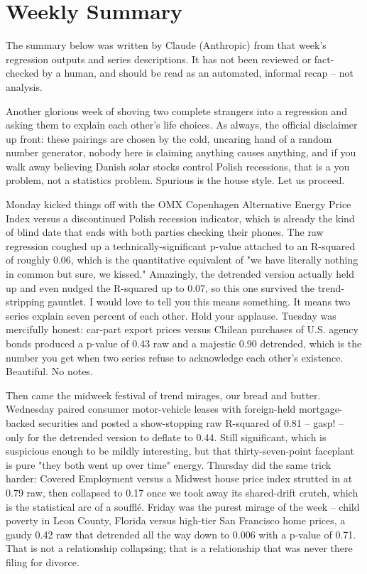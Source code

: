 \section{Weekly Summary}

\begin{tcolorbox}[colback=yellow!10,colframe=black!50,title=AI-Generated Content]
\noindent The summary below was written by Claude (Anthropic) from that week's regression outputs and series descriptions. It has not been reviewed or fact-checked by a human, and should be read as an automated, informal recap -- not analysis.
\end{tcolorbox}

Another glorious week of shoving two complete strangers into a regression and asking them to explain each other's life choices. As always, the official disclaimer up front: these pairings are chosen by the cold, uncaring hand of a random number generator, nobody here is claiming anything causes anything, and if you walk away believing Danish solar stocks control Polish recessions, that is a you problem, not a statistics problem. Spurious is the house style. Let us proceed.

Monday kicked things off with the OMX Copenhagen Alternative Energy Price Index versus a discontinued Polish recession indicator, which is already the kind of blind date that ends with both parties checking their phones. The raw regression coughed up a technically-significant p-value attached to an R-squared of roughly 0.06, which is the quantitative equivalent of "we have literally nothing in common but sure, we kissed." Amazingly, the detrended version actually held up and even nudged the R-squared up to 0.07, so this one survived the trend-stripping gauntlet. I would love to tell you this means something. It means two series explain seven percent of each other. Hold your applause. Tuesday was mercifully honest: car-part export prices versus Chilean purchases of U.S. agency bonds produced a p-value of 0.43 raw and a majestic 0.90 detrended, which is the number you get when two series refuse to acknowledge each other's existence. Beautiful. No notes.

Then came the midweek festival of trend mirages, our bread and butter. Wednesday paired consumer motor-vehicle leases with foreign-held mortgage-backed securities and posted a show-stopping raw R-squared of 0.81 -- gasp! -- only for the detrended version to deflate to 0.44. Still significant, which is suspicious enough to be mildly interesting, but that thirty-seven-point faceplant is pure "they both went up over time" energy. Thursday did the same trick harder: Covered Employment versus a Midwest house price index strutted in at 0.79 raw, then collapsed to 0.17 once we took away its shared-drift crutch, which is the statistical arc of a soufflé. Friday was the purest mirage of the week -- child poverty in Leon County, Florida versus high-tier San Francisco home prices, a gaudy 0.42 raw that detrended all the way down to 0.006 with a p-value of 0.71. That is not a relationship collapsing; that is a relationship that was never there filing for divorce.

